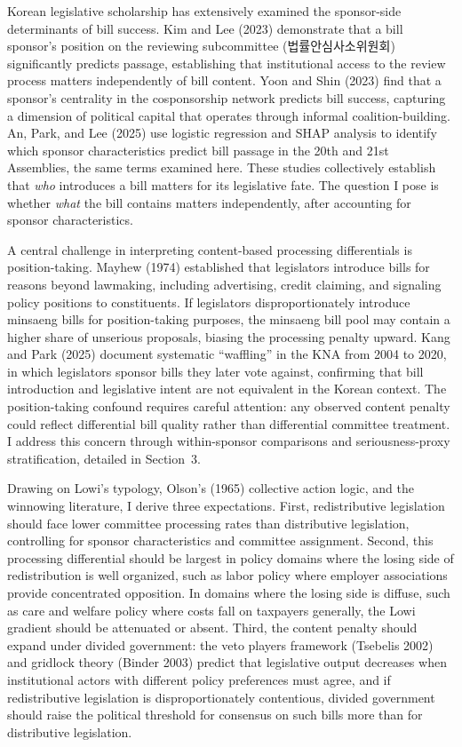 \documentclass[11pt]{article}
\begin{document}
Korean legislative scholarship has extensively examined the sponsor-side determinants of bill success. Kim and Lee (2023) demonstrate that a bill sponsor's position on the reviewing subcommittee (법률안심사소위원회) significantly predicts passage, establishing that institutional access to the review process matters independently of bill content. Yoon and Shin (2023) find that a sponsor's centrality in the cosponsorship network predicts bill success, capturing a dimension of political capital that operates through informal coalition-building. An, Park, and Lee (2025) use logistic regression and SHAP analysis to identify which sponsor characteristics predict bill passage in the 20th and 21st Assemblies, the same terms examined here. These studies collectively establish that \textit{who} introduces a bill matters for its legislative fate. The question I pose is whether \textit{what} the bill contains matters independently, after accounting for sponsor characteristics.

A central challenge in interpreting content-based processing differentials is position-taking. Mayhew (1974) established that legislators introduce bills for reasons beyond lawmaking, including advertising, credit claiming, and signaling policy positions to constituents. If legislators disproportionately introduce minsaeng bills for position-taking purposes, the minsaeng bill pool may contain a higher share of unserious proposals, biasing the processing penalty upward. Kang and Park (2025) document systematic ``waffling'' in the KNA from 2004 to 2020, in which legislators sponsor bills they later vote against, confirming that bill introduction and legislative intent are not equivalent in the Korean context. The position-taking confound requires careful attention: any observed content penalty could reflect differential bill quality rather than differential committee treatment. I address this concern through within-sponsor comparisons and seriousness-proxy stratification, detailed in Section~3.

Drawing on Lowi's typology, Olson's (1965) collective action logic, and the winnowing literature, I derive three expectations. First, redistributive legislation should face lower committee processing rates than distributive legislation, controlling for sponsor characteristics and committee assignment. Second, this processing differential should be largest in policy domains where the losing side of redistribution is well organized, such as labor policy where employer associations provide concentrated opposition. In domains where the losing side is diffuse, such as care and welfare policy where costs fall on taxpayers generally, the Lowi gradient should be attenuated or absent. Third, the content penalty should expand under divided government: the veto players framework (Tsebelis 2002) and gridlock theory (Binder 2003) predict that legislative output decreases when institutional actors with different policy preferences must agree, and if redistributive legislation is disproportionately contentious, divided government should raise the political threshold for consensus on such bills more than for distributive legislation.
\end{document}
